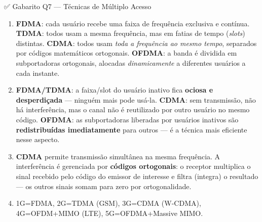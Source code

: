 \documentclass[11pt,a4paper]{article}
\begin{document}
\begin{gabaritocaixa}{✅ Gabarito Q7 --- Técnicas de Múltiplo Acesso}
\begin{enumerate}[label=(\alph*)]
    \item \textbf{FDMA}: cada usuário recebe uma faixa de frequência exclusiva e contínua. \textbf{TDMA}: todos usam a mesma frequência, mas em fatias de tempo (\textit{slots}) distintas. \textbf{CDMA}: todos usam \emph{toda a frequência ao mesmo tempo}, separados por códigos matemáticos ortogonais. \textbf{OFDMA}: a banda é dividida em subportadoras ortogonais, alocadas \emph{dinamicamente} a diferentes usuários a cada instante.
    \item \textbf{FDMA/TDMA}: a faixa/slot do usuário inativo fica \textbf{ociosa e desperdiçada} --- ninguém mais pode usá-la. \textbf{CDMA}: sem transmissão, não há interferência, mas o canal não é reutilizado por outro usuário no mesmo código. \textbf{OFDMA}: as subportadoras liberadas por usuários inativos são \textbf{redistribuídas imediatamente} para outros --- é a técnica mais eficiente nesse aspecto.
    \item \textbf{CDMA} permite transmissão simultânea na mesma frequência. A interferência é gerenciada por \textbf{códigos ortogonais}: o receptor multiplica o sinal recebido pelo código do emissor de interesse e filtra (integra) o resultado --- os outros sinais somam para zero por ortogonalidade.
    \item 1G=FDMA, 2G=TDMA (GSM), 3G=CDMA (W-CDMA), 4G=OFDM+MIMO (LTE), 5G=OFDMA+Massive MIMO.
\end{enumerate}
\end{gabaritocaixa}
\end{document}
